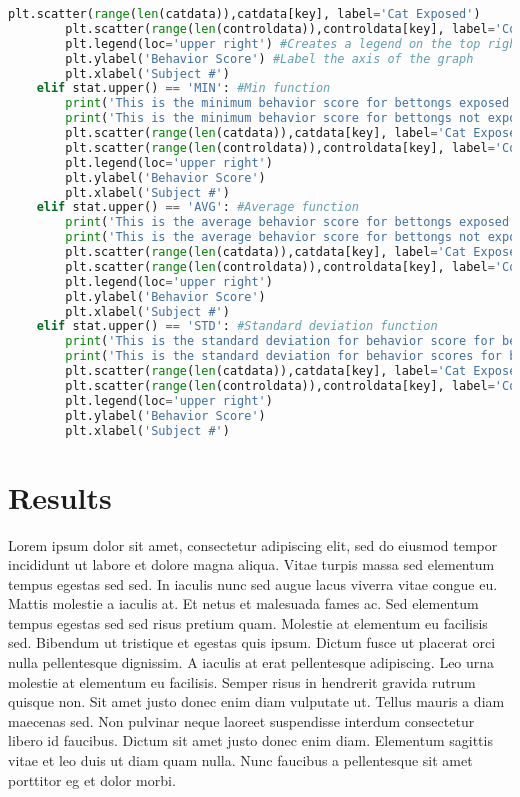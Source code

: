 \documentclass[letterpaper]{article}
\begin{document}
\begin{lstlisting}[language = Python]
        plt.scatter(range(len(catdata)),catdata[key], label='Cat Exposed')
        plt.scatter(range(len(controldata)),controldata[key], label='Control')
        plt.legend(loc='upper right') #Creates a legend on the top right with two labels, 'Cat Exposed' and 'Control'
        plt.ylabel('Behavior Score') #Label the axis of the graph 
        plt.xlabel('Subject #')
    elif stat.upper() == 'MIN': #Min function
        print('This is the minimum behavior score for bettongs exposed to cats:',round(catdata[key].min(), 3))
        print('This is the minimum behavior score for bettongs not exposed to cats:',round(controldata[key].min(), 3))
        plt.scatter(range(len(catdata)),catdata[key], label='Cat Exposed')
        plt.scatter(range(len(controldata)),controldata[key], label='Control')
        plt.legend(loc='upper right')
        plt.ylabel('Behavior Score')
        plt.xlabel('Subject #')
    elif stat.upper() == 'AVG': #Average function
        print('This is the average behavior score for bettongs exposed to cats:',round(catdata[key].mean(), 3))
        print('This is the average behavior score for bettongs not exposed to cats:',round(controldata[key].mean(), 3))
        plt.scatter(range(len(catdata)),catdata[key], label='Cat Exposed')
        plt.scatter(range(len(controldata)),controldata[key], label='Control')
        plt.legend(loc='upper right')
        plt.ylabel('Behavior Score')
        plt.xlabel('Subject #')
    elif stat.upper() == 'STD': #Standard deviation function
        print('This is the standard deviation for behavior score for bettongs exposed to cats:', round(catdata[key].std(), 3))
        print('This is the standard deviation for behavior scores for bettongs not exposed to cats:',round(controldata[key].std(), 3))
        plt.scatter(range(len(catdata)),catdata[key], label='Cat Exposed')
        plt.scatter(range(len(controldata)),controldata[key], label='Control')
        plt.legend(loc='upper right')
        plt.ylabel('Behavior Score')
        plt.xlabel('Subject #')
\end{lstlisting}

\section*{Results}
Lorem ipsum dolor sit amet, consectetur adipiscing elit, sed do eiusmod tempor incididunt ut labore et dolore magna aliqua. Vitae turpis massa sed elementum tempus egestas sed sed. In iaculis nunc sed augue lacus viverra vitae congue eu. Mattis molestie a iaculis at. Et netus et malesuada fames ac. Sed elementum tempus egestas sed sed risus pretium quam. Molestie at elementum eu facilisis sed. Bibendum ut tristique et egestas quis ipsum. Dictum fusce ut placerat orci nulla pellentesque dignissim. A iaculis at erat pellentesque adipiscing. Leo urna molestie at elementum eu facilisis. Semper risus in hendrerit gravida rutrum quisque non. Sit amet justo donec enim diam vulputate ut. Tellus mauris a diam maecenas sed. Non pulvinar neque laoreet suspendisse interdum consectetur libero id faucibus. Dictum sit amet justo donec enim diam. Elementum sagittis vitae et leo duis ut diam quam nulla. Nunc faucibus a pellentesque sit amet porttitor eg
et dolor morbi.
\end{document}
